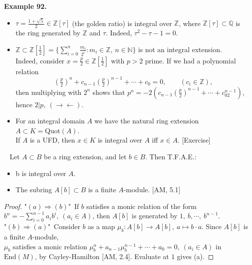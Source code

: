 \documentclass[12pt,a4paper,footinclude=true,headinclude=true]{scrbook} %
\newenvironment{proposition}[2][]
{\renewcommand\theinnercustomprop{#2}\innercustomprop[#1] 
\begin{mdframed}[backgroundcolor=gray!20]\ }
{\end{mdframed}\endinnercustomprop}
\newenvironment{example}[2][Example]
    { \begin{mdframed}[backgroundcolor=gray!20] \textbf{#1 #2.} }
    {  \end{mdframed}}
\begin{document}
\begin{example}{92}
    \begin{itemize}
        \item $\tau=\frac{1+\sqrt{5}}{2}\in\mathbb{Z}[\tau]$ (the golden ratio) is integral over $\mathbb{Z}$, where $\mathbb{Z}[\tau]\subset\mathbb{Q}$ is the ring generated by $\mathbb{Z}$ and $\tau$. Indeed, $\tau^2-\tau-1=0$.
        \item $\mathbb{Z}\subset\mathbb{Z}[\frac{1}{2}]= \{\sum_{i=0}^n \frac{m_i}{2^i}:m_i\in\mathbb{Z},\ n\in\mathbb{N}\}$ is not an integral extension. \\ Indeed, consider $x=\frac{p}{2}\in\mathbb{Z}[\frac{1}{2}]$ with $p>2$ prime. If we had a polynomial relation
        \begin{equation*}
            (\tfrac{p}{2})^n+c_{n-1}(\tfrac{p}{2})^{n-1}+\cdots+c_0=0,\qquad (c_i\in \mathbb{Z}),
        \end{equation*}
        then multiplying with $2^n$ shows that $p^n=-2(c_{n-1}(\frac{p}{2})^{n-1}+\cdots+c_02^{n-1})$, hence $2\big|p,\ (\to\gets)$.
        \item For an integral domain $A$ we have the natural ring extension $A\subset K=\mathrm{Quot}(A)$.\\ If $A$ is a UFD, then $x\in K$ is integral over $A$ iff $x\in A$. [Exercise]
    \end{itemize}
\end{example}

\begin{proposition}{93}
    Let $A\subset B$ be a ring extension, and let $b\in B$. Then T.F.A.E.:
    \begin{itemize}
        \item[(a)] b is integral over $A$.
        \item[(b)] The subring $A[b]\subset B$ is a finite $A$-module. [AM, 5.1]
    \end{itemize}
\end{proposition}
\begin{proof}
    "$(a)\Rightarrow(b)$"\  If $b$ satisfies a monic relation of the form $b^n=- \sum_{i=0}^{n-1}a_ib^i,\ (a_i\in A)$, then $A[b]$ is generated by $1,\ b,\cdots,\ b^{n-1}$. \\
    "$(b)\Rightarrow(a)$"\ Consider $b$ as a map $\mu_b:A[b]\to A[b],\ a\mapsto b\cdot a$. Since $A[b]$ is a finite $A$-module,\\ $\mu_b$ satisfies a monic relation $\mu_b^n+a_{n-1}\mu_b^{n-1}+\cdots+a_0=0,\ (a_i\in A)$ in $\mathrm{End}(M)$, by Cayley-Hamilton [AM, 2.4]. Evaluate at $1$ gives (a).
\end{proof}
\end{document}

